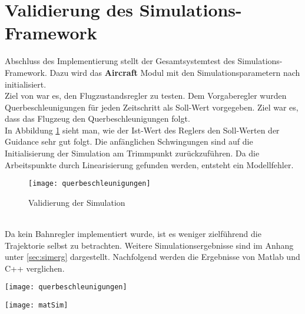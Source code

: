 \section{Validierung des Simulations-Framework}
Abschluss des Implementierung stellt der Gesamtsystemtest des Simulations-Framework. Dazu wird das \textbf{Aircraft} Modul mit den Simulationsparametern nach \cite{Olucak.15.02.2017} initialisiert.\\
Ziel von \cite{Olucak.15.02.2017} war es, den Flugzustandsregler zu testen. Dem Vorgaberegler wurden Querbeschleunigungen für jeden Zeitschritt als Soll-Wert vorgegeben. Ziel war es, dass das Flugzeug den Querbeschleunigungen folgt.\\ In Abbildung \ref{fig:valSim} sieht man, wie der Ist-Wert des Reglers den Soll-Werten der Guidance  sehr gut folgt. Die anfänglichen Schwingungen sind auf die Initialisierung der Simulation am Trimmpunkt zurückzuführen. Da die Arbeitspunkte durch Linearisierung gefunden werden, entsteht ein Modellfehler.
\begin{figure}[h]
	\centering
	\texttt{[image: querbeschleunigungen]}
	\caption{Validierung der Simulation}
	\label{fig:valSim}
\end{figure}\noindent\\
Da kein Bahnregler implementiert wurde, ist es weniger zielführend die Trajektorie selbst zu betrachten. Weitere Simulationsergebnisse sind im Anhang unter \ref{sec:simerg} dargestellt.
Nachfolgend werden die Ergebnisse von Matlab und C++ verglichen.
 \newpage
 \begin{minipage}{0.49\linewidth} 	
 		\texttt{[image: querbeschleunigungen]}
 \end{minipage}
 \begin{minipage}{0.01\linewidth}
	\hfill
\end{minipage}
 \begin{minipage}{0.49\linewidth}
		\texttt{[image: matSim]}
\end{minipage}
\noindent\\
